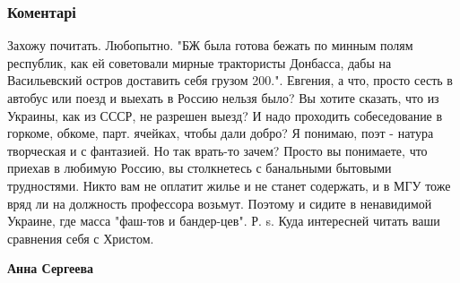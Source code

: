  
 
 
 
 
\subsubsection{Коментарі}

\begin{itemize} %

Захожу почитать. Любопытно. "БЖ была готова бежать по минным полям республик,
как ей советовали мирные трактористы Донбасса, дабы на Васильевский остров
доставить себя грузом 200.". Евгения, а что, просто сесть в автобус или поезд и
выехать в Россию нельзя было? Вы хотите сказать, что из Украины, как из СССР,
не разрешен выезд? И надо проходить собеседование в горкоме, обкоме,
парт. ячейках, чтобы дали добро? Я понимаю, поэт - натура творческая и с
фантазией. Но так врать-то зачем? Просто вы понимаете, что приехав в любимую
Россию, вы столкнетесь с банальными бытовыми трудностями. Никто вам не оплатит
жилье и не станет содержать, и в МГУ тоже вряд ли на должность профессора
возьмут. Поэтому и сидите в ненавидимой Украине, где масса "фаш-тов и
бандер-цев". Р. s. Куда интересней читать ваши сравнения себя с Христом.

\begin{itemize} %
\textbf{Анна Сергеева} 


\end{itemize}
\end{itemize}
